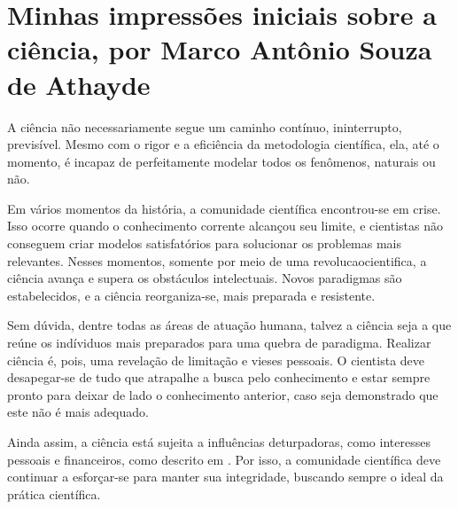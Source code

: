 %

\section{Minhas impressões iniciais sobre a ciência, por Marco Antônio Souza de Athayde}

A ciência não necessariamente segue um caminho contínuo, ininterrupto, previsível. Mesmo com o rigor e a eficiência da metodologia científica, ela, até o momento, é incapaz de perfeitamente modelar todos os fenômenos, naturais ou não.

Em vários momentos da história, a comunidade científica encontrou-se em crise. Isso ocorre quando o conhecimento corrente alcançou seu limite, e cientistas não conseguem criar modelos satisfatórios para solucionar os problemas mais relevantes. Nesses momentos, somente por meio de uma \gls{revolucaocientifica}, a ciência avança e supera os obstáculos intelectuais. Novos paradigmas são estabelecidos, e a ciência reorganiza-se, mais preparada e resistente.

Sem dúvida, dentre todas as áreas de atuação humana, talvez a ciência seja a que reúne os indíviduos mais preparados para uma quebra de paradigma. Realizar ciência é, pois, uma revelação de limitação e vieses pessoais. O cientista deve desapegar-se de tudo que atrapalhe a busca pelo conhecimento e estar sempre pronto para deixar de lado o conhecimento anterior, caso seja demonstrado que este não é mais adequado.

Ainda assim, a ciência está sujeita a influências deturpadoras, como interesses pessoais e financeiros, como descrito em \citep{chavalarias_whats_2017}. Por isso, a comunidade científica deve continuar a esforçar-se para manter sua integridade, buscando sempre o ideal da prática científica.